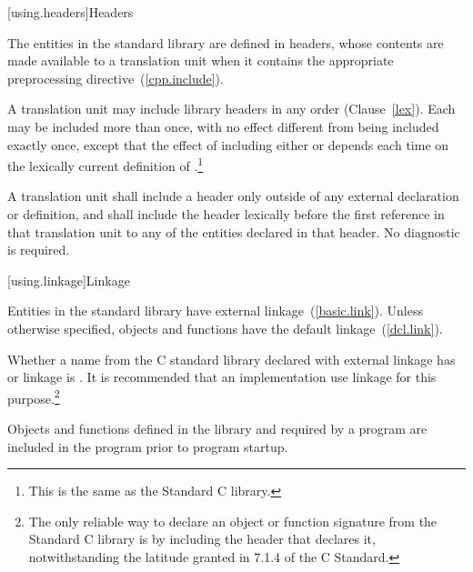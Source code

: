 [using.headers]{Headers}

\pnum
The entities in the \Cpp standard library are defined in headers,
whose contents are made available to a translation unit when it contains the appropriate
%
preprocessing directive~(\ref{cpp.include}).%
%

\pnum
A translation unit may include library headers in any order (Clause~\ref{lex}).
%
Each may be included more than once, with no effect different from
being included exactly once, except that the effect of including either
or
depends each time on the lexically
%
%
%
%
current definition of
%
%
.\footnote{This is the same as the Standard C library.}

\pnum
A translation unit shall include a header only outside of any
%
external declaration or definition, and shall include the header lexically
before the first reference in that translation unit to any of the entities
declared in that header. No diagnostic is required.

[using.linkage]{Linkage}

\pnum
Entities in the \Cpp standard library have external linkage~(\ref{basic.link}).
Unless otherwise specified, objects and functions have the default
linkage~(\ref{dcl.link}).

\pnum
{}%
Whether a name from the C standard library declared with
external linkage has
%
%
%
or
%
linkage is . It is recommended that an
implementation use
linkage for this purpose.\footnote{The only reliable way to declare an object or
function signature from the Standard C library is by including the header that
declares it, notwithstanding the latitude granted in 7.1.4 of the C
Standard.}

\pnum
Objects and functions
defined in the library and required by a \Cpp program are included in
the program prior to program startup.

